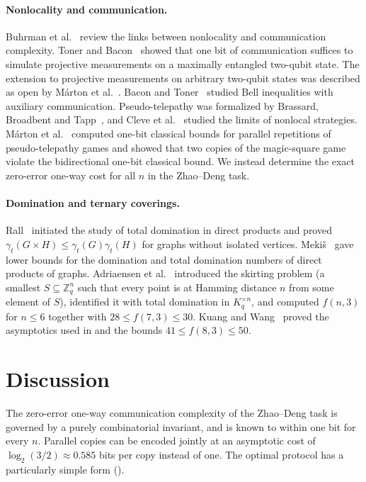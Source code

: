 \documentclass[12pt,a4paper]{article}
\theoremstyle{definition}
\theoremstyle{remark}
\newcommand{\Z}{\mathbb{Z}}
\newcommand{\gammat}{\gamma_t}
\begin{document}
\paragraph{Nonlocality and communication.} Buhrman et al.~\cite{buhrman2010} review the links between nonlocality and communication complexity. Toner and Bacon~\cite{toner2003} showed that one bit of communication suffices to simulate projective measurements on a maximally entangled two-qubit state. The extension to projective measurements on arbitrary two-qubit states was described as open by M\'arton et al.~\cite{marton2024}. Bacon and Toner~\cite{bacon2003} studied Bell inequalities with auxiliary communication. Pseudo-telepathy was formalized by Brassard, Broadbent and Tapp~\cite{brassard2005}, and Cleve et al.~\cite{cleve2004} studied the limits of nonlocal strategies. M\'arton et al.~\cite{marton2024} computed one-bit classical bounds for parallel repetitions of pseudo-telepathy games and showed that two copies of the magic-square game violate the bidirectional one-bit classical bound. We instead determine the exact zero-error one-way cost for all $n$ in the Zhao--Deng task.

\paragraph{Domination and ternary coverings.} Rall~\cite{rall2005} initiated the study of total domination in direct products and proved $\gammat(G\times H)\le\gammat(G)\gammat(H)$ for graphs without isolated vertices. Meki\v{s}~\cite{mekis2010} gave lower bounds for the domination and total domination numbers of direct products of graphs. Adriaensen et al.~\cite{adriaensen2026} introduced the skirting problem (a smallest $S\subseteq\Z_q^n$ such that every point is at Hamming distance $n$ from some element of $S$), identified it with total domination in $K_q^{\times n}$, and computed $f(n,3)$ for $n\le6$ together with $28\le f(7,3)\le30$. Kuang and Wang~\cite{kuangwang2026} proved the asymptotics used in  and the bounds $41\le f(8,3)\le50$.

\section{Discussion}
\label{sec:discussion}

The zero-error one-way communication complexity of the Zhao--Deng task is governed by a purely combinatorial invariant, and is known to within one bit for every $n$. Parallel copies can be encoded jointly at an asymptotic cost of $\log_2(3/2)\approx0.585$ bits per copy instead of one. The optimal protocol has a particularly simple form ().
\end{document}

